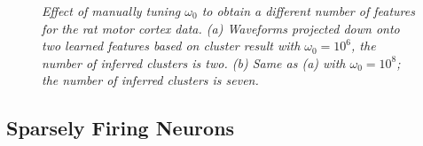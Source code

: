 \documentclass[journal]{IEEEtran}
\begin{document}
\begin{figure}[!htbp]
\centering

  \caption{\label{fig:Tuning_Parameter}\small \emph{
{Effect of manually tuning $\omega_0$ to obtain a different number of features for the rat motor cortex data.}
(a) Waveforms projected down onto two learned features based on cluster result with $\omega_0=10^{6}$, the number of inferred clusters is two. (b) Same as (a) with $\omega_0=10^{8}$; the number of inferred clusters is seven.
   }}
\end{figure}



\subsection{Sparsely Firing Neurons} \label{sec:sparse}
\end{document}
